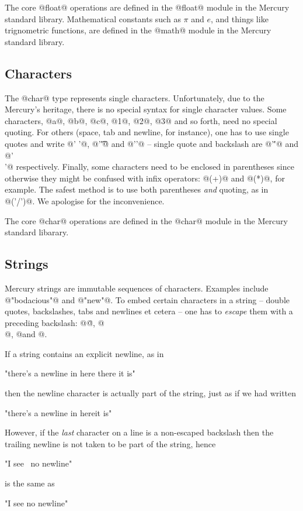 The core @float@ operations are defined in the @float@ module in the
Mercury standard library.  Mathematical constants such as $\pi$ and $e$, and
things like trignometric functions, are defined in the @math@ module in the
Mercury standard library.

\subsection{Characters}

The @char@ type represents single characters.  Unfortunately, due to the
Mercury's heritage, there is no special syntax for single character
values.  Some characters, @a@, @b@, @c@, @1@, @2@, @3@ and so forth,
need no special quoting.
For others (space, tab and newline, for instance), one has to use
single quotes and write @' '@, @'\t'@ and
@'\n'@ -- single quote and backslash are @'\''@ and
@'\\'@ respectively.
Finally, some characters need to be enclosed in parentheses since
otherwise they might be confused with infix operators: @(+)@ and
@(*)@, for example.
The safest method is to use both parentheses \emph{and} quoting, as in
@('/')@.  We apologise for the inconvenience.

The core @char@ operations are defined in the @char@ module in the
Mercury standard libarary.



\subsection{Strings}

Mercury strings are immutable sequences of characters.  Examples include
@"bodacious"@ and @"new\nline"@.  To embed certain characters in a
string -- double quotes, backslashes, tabs and newlines
et cetera -- one has to \emph{escape} them with a preceding backslash:
@\"@, @\\@, @\t@ and @\n@.

If a string contains an explicit newline, as in
\begin{myverbatim}
    "there's a newline in here
there it is"
\end{myverbatim}
then the newline character is actually part of the string, just as
if we had written
\begin{myverbatim}
    "there's a newline in here\nthere it is"
\end{myverbatim}
However, if the \emph{last} character on a line is a non-escaped backslash
then the trailing newline is not taken to be part of the string, hence
\begin{myverbatim}
    "I see \
no newline"
\end{myverbatim}
is the same as
\begin{myverbatim}
    "I see no newline"
\end{myverbatim}

